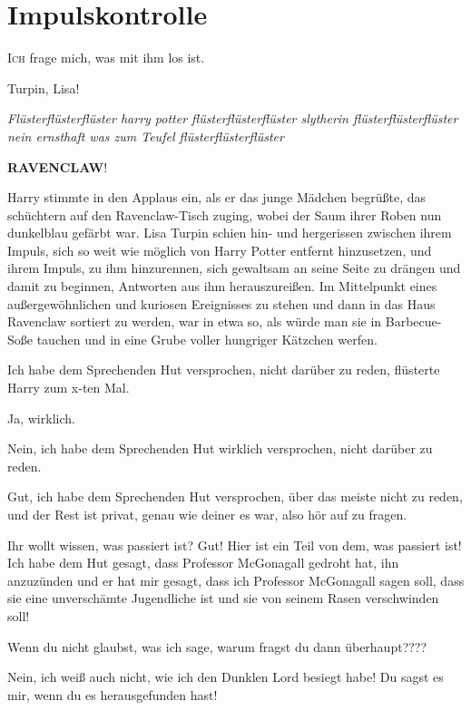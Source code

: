 \chapter{Impulskontrolle}

\lettrine{\loq I}{ch} frage mich, was mit ihm los ist.\grqq{}

\glqq{}Turpin, Lisa!\grqq{}

\emph{Flüsterflüsterflüster harry potter flüsterflüsterflüster slytherin
flüsterflüsterflüster nein ernsthaft was zum Teufel flüsterflüsterflüster}

\glqq{}\textbf{RAVENCLAW}!\grqq{}

Harry stimmte in den Applaus ein, als er das junge Mädchen begrüßte, das
schüchtern auf den Ravenclaw-Tisch zuging, wobei der Saum ihrer Roben nun
dunkelblau gefärbt war. Lisa Turpin schien hin- und hergerissen zwischen ihrem
Impuls, sich so weit wie möglich von Harry Potter entfernt hinzusetzen, und
ihrem Impuls, zu ihm hinzurennen, sich gewaltsam an seine Seite zu drängen und
damit zu beginnen, Antworten aus ihm herauszureißen. Im Mittelpunkt eines
außergewöhnlichen und kuriosen Ereignisses zu stehen und dann in das Haus
Ravenclaw sortiert zu werden, war in etwa so, als würde man sie in Barbecue-Soße
tauchen und in eine Grube voller hungriger Kätzchen werfen.

\glqq{}Ich habe dem Sprechenden Hut versprochen, nicht darüber zu reden\grqq{},
flüsterte Harry zum x-ten Mal.

\glqq{}Ja, wirklich.\grqq{}

\glqq{}Nein, ich habe dem Sprechenden Hut wirklich versprochen, nicht darüber zu
reden.\grqq{}

\glqq{}Gut, ich habe dem Sprechenden Hut versprochen, über das meiste nicht zu
reden, und der Rest ist privat, genau wie deiner es war, also hör auf zu
fragen.\grqq{}

\glqq{}Ihr wollt wissen, was passiert ist? Gut! Hier ist ein Teil von dem, was
passiert ist! Ich habe dem Hut gesagt, dass Professor McGonagall gedroht hat,
ihn anzuzünden und er hat mir gesagt, dass ich Professor McGonagall sagen soll,
dass sie eine unverschämte Jugendliche ist und sie von seinem Rasen verschwinden
soll!\grqq{}

\glqq{}Wenn du nicht glaubst, was ich sage, warum fragst du dann
überhaupt????\grqq{}

\glqq{}Nein, ich weiß auch nicht, wie ich den Dunklen Lord besiegt habe! Du
sagst es mir, wenn du es herausgefunden hast!\grqq{}

